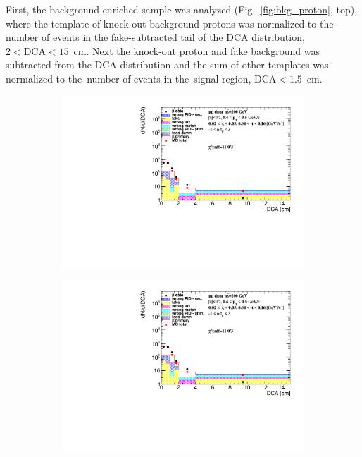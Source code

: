 First, the background enriched sample was analyzed  (Fig.~\ref{fig:bkg_proton}, top), where the template of knock-out background protons was normalized to the number of events in the fake-subtracted tail of the $\textrm{DCA}$ distribution, $2<\textrm{DCA}<15$~cm. Next the knock-out proton and fake background was subtracted from the $\textrm{DCA}$ distribution and the sum of other templates was normalized to the~number of events in the~signal region,  $\textrm{DCA}<1.5$~cm. 

\begin{figure}[h!]
	\centering
	\begin{subfigure}{.49\textwidth}
		\includegraphics[width=\linewidth, page=1]{chapters/chrgSTAR/img/DCAproton/background_p_bar_0.pdf}
	\end{subfigure}
	\begin{subfigure}{.49\textwidth}
		\includegraphics[width=\linewidth, page=2]{chapters/chrgSTAR/img/DCAproton/background_p_bar_0.pdf}

\end{subfigure}
\end{figure}

